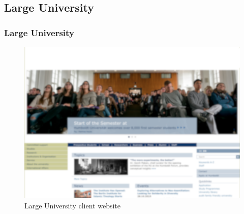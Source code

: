 \documentclass[aspectratio=169]{beamer}
\begin{document}
\subsection{Large University}
\begin{frame}
  \frametitle{Large University}
  \begin{figure}
    \includegraphics[height=.7\textheight]{./src/img/003_-_large_university.png}
    \caption{Large University client website}
  \end{figure}
\end{frame}
\end{document}

